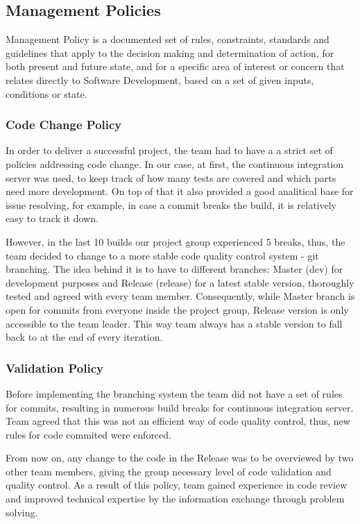 \documentclass[10pt]{article}
\begin{document}
\subsection{Management Policies}

Management Policy is a documented set of rules, constraints, standards and guidelines that apply to the decision making and determination of action, for both present and future state, and for a specific area of interest or concern that relates directly to Software Development, based on a set of given inputs, conditions or state.

\subsubsection{Code Change Policy}

In order to deliver a successful project, the team had to have a a strict set of policies addressing code change. In our case, at first, the continuous integration server was used, to keep track of how many tests are covered and which parts need more development. On top of that it also provided a good analitical base for issue resolving, for example, in case a commit breaks the build, it is relatively easy to track it down.

However, in the last 10 builds our project group experienced 5 breaks, thus, the team decided to change to a more stable code quality control system - git branching. The idea behind it is to have to different branches: Master (dev) for development purposes and Release (release) for a latest stable version, thoroughly tested and agreed with every team member. Consequently, while Master branch is open for commits from everyone inside the project group, Release version is only accessible to the team leader. This way team always has a stable version to fall back to at the end of every iteration.

\subsubsection{Validation Policy}

Before implementing the branching system the team did not have a set of rules for commits, resulting in numerous build breaks for continuous integration server. Team agreed that this was not an efficient way of code quality control, thus, new rules for code commited were enforced. 

From now on, any change to the code in the Release was to be overviewed by two other team members, giving the group necessary level of code validation and quality control. As a result of this policy, team gained experience in code review and improved technical expertise by the information exchange through problem solving.
\end{document}
